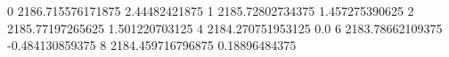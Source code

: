 0 2186.715576171875 2.44482421875
1 2185.72802734375 1.457275390625
2 2185.77197265625 1.501220703125
4 2184.270751953125 0.0
6 2183.78662109375 -0.484130859375
8 2184.459716796875 0.18896484375
